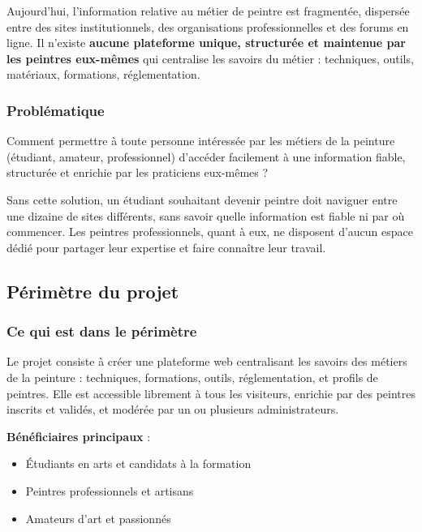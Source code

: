 \documentclass[12pt,a4paper]{report}
\begin{document}
Aujourd'hui, l'information relative au métier de peintre est fragmentée, dispersée entre des sites institutionnels, des organisations professionnelles et des forums en ligne. Il n'existe \textbf{aucune plateforme unique, structurée et maintenue par les peintres eux-mêmes} qui centralise les savoirs du métier : techniques, outils, matériaux, formations, réglementation.

\subsubsection*{Problématique}

Comment permettre à toute personne intéressée par les métiers de la peinture (étudiant, amateur, professionnel) d'accéder facilement à une information fiable, structurée et enrichie par les praticiens eux-mêmes ?

Sans cette solution, un étudiant souhaitant devenir peintre doit naviguer entre une dizaine de sites différents, sans savoir quelle information est fiable ni par où commencer. Les peintres professionnels, quant à eux, ne disposent d'aucun espace dédié pour partager leur expertise et faire connaître leur travail.

\subsection{Périmètre du projet}

\subsubsection*{Ce qui est dans le périmètre}

Le projet consiste à créer une plateforme web centralisant les savoirs des métiers de la peinture : techniques, formations, outils, réglementation, et profils de peintres. Elle est accessible librement à tous les visiteurs, enrichie par des peintres inscrits et validés, et modérée par un ou plusieurs administrateurs.

\textbf{Bénéficiaires principaux} :
\begin{itemize}
  \item Étudiants en arts et candidats à la formation
  \item Peintres professionnels et artisans
  \item Amateurs d'art et passionnés
\end{itemize}
\end{document}
